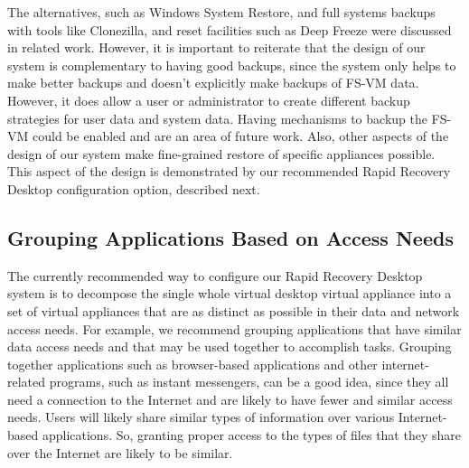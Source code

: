 The alternatives, such as Windows System Restore, and full systems backups with tools like Clonezilla, and reset facilities such as Deep Freeze were discussed in related work. However, it is important to reiterate that the design of our system is complementary to having good backups, since the system only helps to make better backups and doesn't explicitly make backups of FS-VM data.  However, it does allow a user or administrator to create different backup strategies for user data and system data. Having mechanisms to backup the FS-VM could be enabled and are an area of future work. Also, other aspects of the design of our system make fine-grained restore of specific appliances possible. This aspect of the design is demonstrated by our recommended Rapid Recovery Desktop configuration option, described next.

\subsection{Grouping Applications Based on Access Needs}

The currently recommended way to configure our Rapid Recovery Desktop system is to decompose the single whole virtual desktop virtual appliance into a set of virtual appliances that are as distinct as possible in their data and network access needs. For example, we recommend grouping applications that have similar data access needs and that may be used together to accomplish tasks. Grouping together applications such as browser-based applications and other internet-related programs, such as instant messengers, can be a good idea, since they all need a connection to the Internet and are likely to have fewer and similar access needs. Users will likely share similar types of information over various Internet-based applications. So, granting proper access to the types of files that they share over the Internet are likely to be similar. 

